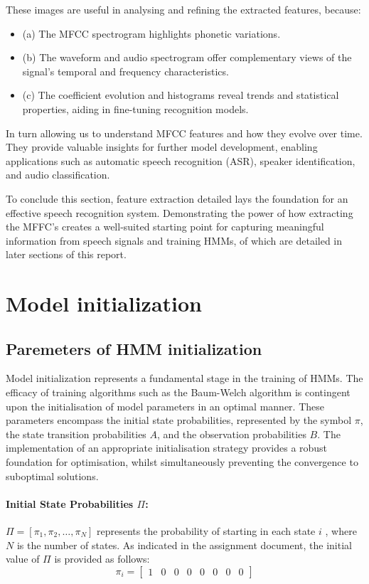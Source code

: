 \documentclass{article}
\begin{document}
These images are useful in analysing and refining the extracted features, because: 
\begin{itemize}
	\item (a) The MFCC spectrogram highlights phonetic variations.
	\item (b) The waveform and audio spectrogram offer complementary views of the signal’s temporal and frequency characteristics.
	\item (c) The coefficient evolution and histograms reveal trends and statistical properties, aiding in fine-tuning recognition models.
\end{itemize}


In turn allowing us to understand MFCC features and how they evolve over time. They provide valuable insights for further model development, enabling applications such as automatic speech recognition (ASR), speaker identification, and audio classification.

To conclude this section, feature extraction detailed lays the foundation for an effective speech recognition system. Demonstrating the power of how extracting the MFFC’s creates a well-suited starting point for capturing meaningful information from speech signals and training HMMs, of which are detailed in later sections of this report. 






\section{Model initialization}


\subsection{Paremeters of HMM initialization}

Model initialization represents a fundamental stage in the training of HMMs. The efficacy of training algorithms such as the Baum-Welch algorithm is contingent upon the initialisation of model parameters in an optimal manner. These parameters encompass the initial state probabilities, represented by the symbol $\pi$, the state transition probabilities $A$, and the observation probabilities $B$. The implementation of an appropriate initialisation strategy provides a robust foundation for optimisation, whilst simultaneously preventing the convergence to suboptimal solutions. 

\paragraph{Initial State Probabilities $\Pi$:}
	 $\Pi = [\pi_1, \pi_2, \dots, \pi_N]$ represents the probability of starting in each state $i$ , where  $N$ is the number of states.
As indicated in the assignment document, the initial value of $\Pi$ is provided as follows:
\begin{equation}
\label{eqn:pi}
\pi_i = \begin{bmatrix}
 	1 & 0 & 0 & 0 & 0 & 0 & 0 & 0
 \end{bmatrix}
\end{equation}
\end{document}
